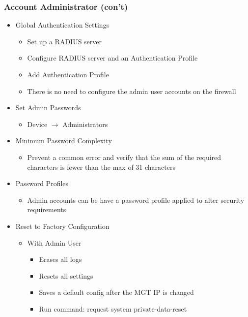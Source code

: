\subsubsection{Account Administrator (con't)}
    \begin{itemize}
        \item Global Authentication Settings
            \begin{itemize}
                \item Set up a RADIUS server 
                \item Configure RADIUS server and an Authentication Profile
                \item Add Authentication Profile
                \item There is no need to configure the admin user accounts on the firewall
            \end{itemize}
        \item Set Admin Passwords
            \begin{itemize}
                \item Device $\rightarrow$ Administrators
            \end{itemize}
        \item Minimum Password Complexity
            \begin{itemize}
                \item Prevent a common error and verify that the sum of the required characters is fewer than the max of 31 characters
                \end{itemize}
        \item Password Profiles
            \begin{itemize}
                \item Admin accounts can be have a password profile applied to alter security requirements
                \end{itemize}
        \item Reset to Factory Configuration
            \begin{itemize}
                \item With Admin User
                    \begin{itemize}
                        \item Erases all logs
                        \item Resets all settings
                        \item Saves a default config after the MGT IP is changed
                        \item Run command:     request system private-data-reset

\end{itemize}
\end{itemize}
\end{itemize}
